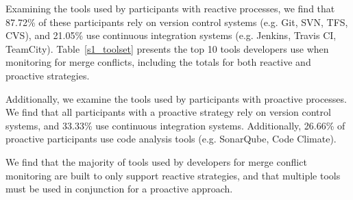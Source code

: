 Examining the tools used by participants with reactive processes, we find that 87.72\% of these participants rely on version control systems (e.g. Git, SVN, TFS, CVS), and 21.05\% use continuous integration systems (e.g. Jenkins, Travis CI, TeamCity).
Table~\ref{s1_toolset} presents the top 10 tools developers use when monitoring for merge conflicts, including the totals for both reactive and proactive strategies.

Additionally, we examine the tools used by participants with proactive processes.
We find that all participants with a proactive strategy rely on version control systems, and 33.33\% use continuous integration systems.
Additionally, 26.66\% of proactive participants use code analysis tools (e.g. SonarQube, Code Climate).

We find that the majority of tools used by developers for merge conflict monitoring are built to only support reactive strategies, and that multiple tools must be used in conjunction for a proactive approach.


\newcolumntype{b}{X}


